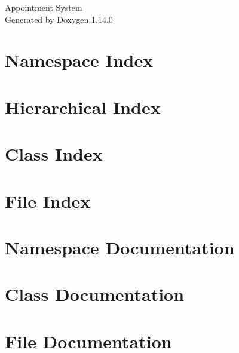 \documentclass[twoside]{book}
\newcommand{\+}{\discretionary{\mbox{\scriptsize$\hookleftarrow$}}{}{}}
\newcommand{\clearemptydoublepage}{%
    \newpage{\pagestyle{empty}\cleardoublepage}%
  }
\begin{document}
  \raggedbottom
    \hypersetup{pageanchor=false,
                bookmarksnumbered=true,
                pdfencoding=unicode
               }
  \begin{titlepage}
  \vspace*{7cm}
  \begin{center}%
  {\Large Appointment System}\\
  \vspace*{1cm}
  {\large Generated by Doxygen 1.14.0}\\
  \end{center}
  \end{titlepage}
  \clearemptydoublepage
  \tableofcontents
  \clearemptydoublepage
  \hypersetup{pageanchor=true}
\chapter{Namespace Index}

\chapter{Hierarchical Index}

\chapter{Class Index}

\chapter{File Index}

\chapter{Namespace Documentation}

\chapter{Class Documentation}





\chapter{File Documentation}

  \backmatter
  \newpage
  \clearemptydoublepage
  \printindex
\end{document}
